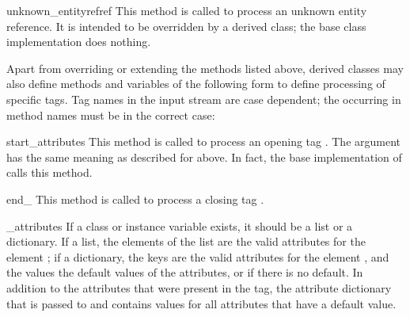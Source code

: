 \begin{funcdesc}{unknown_entityref}{ref}
This method is called to process an unknown entity reference.  It is
intended to be overridden by a derived class; the base class
implementation does nothing.
\end{funcdesc}

Apart from overriding or extending the methods listed above, derived
classes may also define methods and variables of the following form to
define processing of specific tags.  Tag names in the input stream are
case dependent; the  occurring in method names must be in the
correct case:

\begin{funcdescni}{start_}{attributes}
This method is called to process an opening tag .  The
 argument has the same meaning as described for
 above.  In fact, the base implementation of
 calls this method.
\end{funcdescni}

\begin{funcdescni}{end_}{}
This method is called to process a closing tag .
\end{funcdescni}

\begin{datadescni}{_attributes}
If a class or instance variable  exists, it 
should be a list or a dictionary.  If a list, the elements of the list 
are the valid attributes for the element ; if a dictionary,
the keys are the valid attributes for the element , and the
values the default values of the attributes, or  if there
is no default.
In addition to the attributes that were present in the tag, the
attribute dictionary that is passed to  and
 contains values for all attributes that
have a default value.
\end{datadescni}
